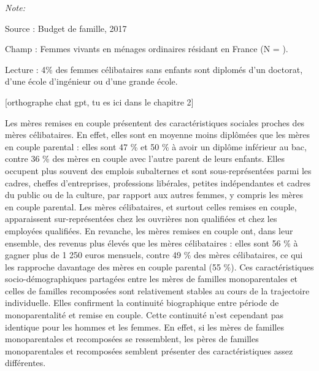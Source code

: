 \documentclass[
  12pt,
]{book}
\begin{document}
\begin{table}[!h]
{\begin{threeparttable}
\begin{tablenotes}
\item \textit{Note: } 
\item Source : Budget de famille, 2017
\item Champ : Femmes vivants en ménages ordinaires résidant en France (N = ).
\item Lecture : 4\% des femmes célibataires sans enfants sont diplomés d'un doctorat, d'une école d'ingénieur ou d'une grande école.
\end{tablenotes}
\end{threeparttable}}
\end{table}

{[}orthographe chat gpt, tu es ici dans le chapitre 2{]}

Les mères remises en couple présentent des caractéristiques sociales
proches des mères célibataires. En effet, elles sont en moyenne moins
diplômées que les mères en couple parental : elles sont 47 \% et 50 \% à
avoir un diplôme inférieur au bac, contre 36 \% des mères en couple avec
l'autre parent de leurs enfants. Elles occupent plus souvent des emplois
subalternes et sont sous-représentées parmi les cadres, cheffes
d'entreprises, professions libérales, petites indépendantes et cadres du
public ou de la culture, par rapport aux autres femmes, y compris les
mères en couple parental. Les mères célibataires, et surtout celles
remises en couple, apparaissent sur-représentées chez les ouvrières non
qualifiées et chez les employées qualifiées. En revanche, les mères
remises en couple ont, dans leur ensemble, des revenus plus élevés que
les mères célibataires : elles sont 56 \% à gagner plus de 1 250 euros
mensuels, contre 49 \% des mères célibataires, ce qui les rapproche
davantage des mères en couple parental (55 \%). Ces caractéristiques
socio-démographiques partagées entre les mères de familles
monoparentales et celles de familles recomposées sont relativement
stables au cours de la trajectoire individuelle. Elles confirment la
continuité biographique entre période de monoparentalité et remise en
couple. Cette continuité n'est cependant pas identique pour les hommes
et les femmes. En effet, si les mères de familles monoparentales et
recomposées se ressemblent, les pères de familles monoparentales et
recomposées semblent présenter des caractéristiques assez différentes.
\end{document}
